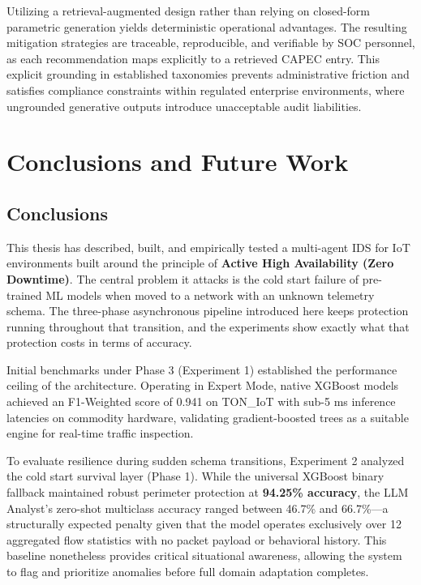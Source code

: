 \documentclass[conference]{IEEEtran}
\begin{document}
Utilizing a retrieval-augmented design rather than relying on closed-form parametric generation yields deterministic operational advantages. The resulting mitigation strategies are traceable, reproducible, and verifiable by SOC personnel, as each recommendation maps explicitly to a retrieved CAPEC entry. This explicit grounding in established taxonomies prevents administrative friction and satisfies compliance constraints within regulated enterprise environments, where ungrounded generative outputs introduce unacceptable audit liabilities.


\section{Conclusions and Future Work}
\label{sec:conclusiones}

\subsection{Conclusions}

This thesis has described, built, and empirically tested a multi-agent IDS for IoT environments built around the principle of \textbf{Active High Availability (Zero Downtime)}. The central problem it attacks is the cold start failure of pre-trained ML models when moved to a network with an unknown telemetry schema. The three-phase asynchronous pipeline introduced here keeps protection running throughout that transition, and the experiments show exactly what that protection costs in terms of accuracy.

Initial benchmarks under Phase 3 (Experiment 1) established the performance ceiling of the architecture. Operating in Expert Mode, native XGBoost models achieved an F1-Weighted score of 0.941 on TON\_IoT with sub-5 ms inference latencies on commodity hardware, validating gradient-boosted trees as a suitable engine for real-time traffic inspection.

To evaluate resilience during sudden schema transitions, Experiment 2 analyzed the cold start survival layer (Phase 1). While the universal XGBoost binary fallback maintained robust perimeter protection at \textbf{94.25\% accuracy}, the LLM Analyst's zero-shot multiclass accuracy ranged between 46.7\% and 66.7\%---a structurally expected penalty given that the model operates exclusively over 12 aggregated flow statistics with no packet payload or behavioral history. This baseline nonetheless provides critical situational awareness, allowing the system to flag and prioritize anomalies before full domain adaptation completes.
\end{document}
